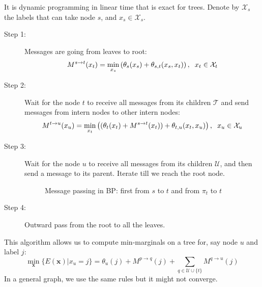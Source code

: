 \documentclass[10pt,a4paper]{article}
\begin{document}
It is dynamic programming in linear time that is exact for trees. Denote by $\mathcal{X}_s$ the labels that can take node $s$, and $x_s\in\mathcal{X}_s$. 
\begin{description}
\item[Step 1: ]Messages are going from leaves to root:
\begin{equation}
M^{s\rightarrow t}(x_t) = \min_{x_s} \left( \theta_s(x_s) + \theta_{s,t}(x_s,x_t) \right), \hspace{0.2cm} x_t\in\mathcal{X}_t
\label{eq:}
\end{equation}

\item[Step 2:]Wait for the node $t$ to receive all messages from its children $\mathcal{T}$ and send messages from intern nodes to other intern nodes: 
\begin{equation}
M^{t\rightarrow u}(x_u) = \min_{x_t} \left( (\theta_t(x_t) + M^{s\rightarrow t}(x_t) ) + \theta_{t,u}(x_t,x_u) \right), \hspace{0.2cm} x_u\in\mathcal{X}_u
\label{eq:}
\end{equation}

\item[Step 3:] Wait for the node $u$ to receive all messages from its children $\mathcal{U}$, and then send a message to its parent. Iterate till we reach the root node.

\begin{figure}[h!]
\centering
{}
\caption{Message passing in BP: first from $s$ to $t$ and from $\pi_t$ to $t$ }
\label{fig1}
\end{figure}

\item[Step 4:] Outward pass from the root to all the leaves. 
\end{description}

This algorithm allows us to compute min-marginals on a tree for, say node $u$ and label $j$:
\begin{equation}
\min_{\mathbf{x}} \{ E(\mathbf{x}) | x_u = j \} = \theta_u(j) + M^{p \rightarrow q}(j) + \sum_{q \in \mathcal{U}\cup \{t\}}M^{q\rightarrow u}(j)
\label{eq:}
\end{equation}
In a general graph, we use the same rules but it might not converge.
\end{document}
